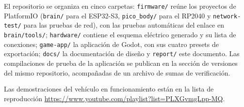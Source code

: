\documentclass[journal]{IEEEtran}
\begin{document}
El repositorio se organiza en cinco carpetas: \texttt{firmware/} reúne los proyectos de PlatformIO (\texttt{brain/} para el ESP32-S3, \texttt{pico\_body/} para el RP2040 y \texttt{network-test/} para las pruebas de red), con las pruebas automáticas del enlace en \texttt{brain/tools/}; \texttt{hardware/} contiene el esquema eléctrico generado y su lista de conexiones; \texttt{game-app/} la aplicación de Godot, con sus cuatro presets de exportación; \texttt{docs/} la documentación de diseño y \texttt{report/} este documento. Las compilaciones de prueba de la aplicación se publican en la sección de versiones del mismo repositorio, acompañadas de un archivo de sumas de verificación.

Las demostraciones del vehículo en funcionamiento están en la lista de reproducción \url{https://www.youtube.com/playlist?list=PLXGvmgLpp-MQ}.

\end{document}
